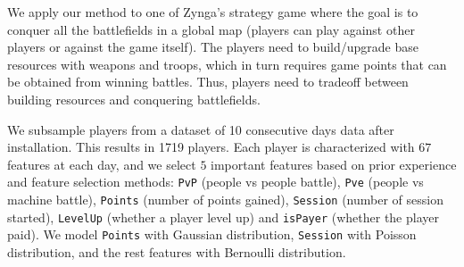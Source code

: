 We apply our method to one of  Zynga's strategy game where the goal is to conquer all the battlefields
in a global map (players can play against other players or against the game itself). The players need to build/upgrade base resources with  weapons and troops, which in turn 
requires game points that can be obtained from winning battles.  Thus,  players need to 
tradeoff between building resources and conquering battlefields.


We subsample players from  a dataset of 10 consecutive days data after installation. This results in 1719 players.
Each player is characterized with $67$ features at each day, and we select $5$ important 
features based on prior experience and feature selection methods: \texttt{PvP} (people vs people battle), 
\texttt{Pve} (people vs machine battle), \texttt{Points} (number of points gained), \texttt{Session} 
(number of session started), \texttt{LevelUp} (whether a player level up) and \texttt{isPayer} (whether
the player paid). We model \texttt{Points}  with Gaussian distribution, \texttt{Session} with
Poisson distribution, and the rest features with Bernoulli distribution.






